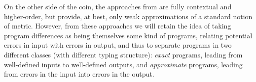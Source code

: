 
On the other side of the coin, the approaches from \cite{chaudhuri, dallago:differential-stlc} are fully contextual and higher-order, but provide, at best, only weak approximations of a standard notion of metric.  
 However, from these approaches we will retain the idea  of taking program differences as being themselves some kind of programs, relating potential errors in input with errors in  output, and thus to separate programs in two different classes (with different typing structure): \emph{exact} programs, leading from well-defined inputs to well-defined outputs, and \emph{approximate} programs, leading from errors in the input into errors in the output.
%

%
%
%
%
%
%
%



